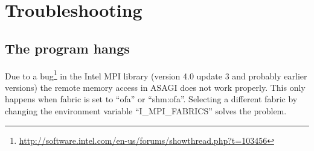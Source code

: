 \section{Troubleshooting}

\subsection{The program hangs}

Due to a bug\footnote{\url{http://software.intel.com/en-us/forums/showthread.php?t=103456}} in the Intel MPI library (version 4.0 update 3 and probably earlier versions) the remote memory access in ASAGI does not work properly. This only happens when fabric is set to ``ofa'' or ``shm:ofa''. Selecting a different fabric by changing the environment variable ``I\_MPI\_FABRICS'' solves the problem.